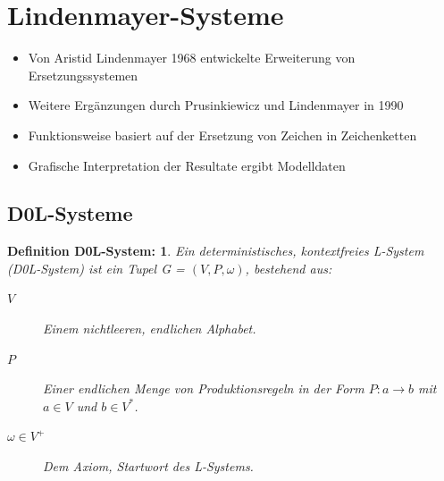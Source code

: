 
\newpage
\slidetitle{}
\section{Lindenmayer-Systeme \\}

\begin{itemize}
	\item Von Aristid Lindenmayer 1968 entwickelte Erweiterung von Ersetzungssystemen \\
	
	\item Weitere Ergänzungen durch Prusinkiewicz und Lindenmayer in 1990\\
	
	\item Funktionsweise basiert auf der Ersetzung von Zeichen in Zeichenketten \\
	
	\item Grafische Interpretation der Resultate ergibt Modelldaten
	
\end{itemize}

\newpage
{}

\subsection{D0L-Systeme\\ }
\newtheorem{defD0LSystem}{Definition D0L-System:}[section]
\begin{defD0LSystem}
	Ein deterministisches, kontextfreies L-System (D0L-System) ist ein Tupel G = $(V, P, \omega)$, bestehend aus:
	
	\begin{description}
		\item[\boldmath$V$ ] Einem nichtleeren, endlichen Alphabet.\\
		
		\item[\boldmath$P$ ] Einer endlichen Menge von Produktionsregeln in der Form $P: a \rightarrow b$ mit $a \in V$ und $b \in V^*$. \\
		
		\item[\boldmath$\omega \in V^+$ ]  Dem Axiom, Startwort des L-Systems.		
	\end{description}
\end{defD0LSystem}

\newpage


